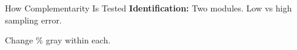 \documentclass[
  ignorenonframetext,
]{beamer}
\begin{document}
\begin{frame}{How Complementarity Is Tested}
\protect\hypertarget{how-complementarity-is-tested}{}
\textbf{Identification:} Two modules. Low vs high sampling error.

\begin{figure}

\begin{minipage}[t]{0.50\linewidth}

{\centering 


}

\end{minipage}%
%
\begin{minipage}[t]{0.50\linewidth}

{\centering 


}

\end{minipage}%

\end{figure}

Change \% gray within each.

\begin{figure}

\begin{minipage}[t]{0.50\linewidth}

{\centering 


}

\end{minipage}%
%
\begin{minipage}[t]{0.50\linewidth}

{\centering 


}

\end{minipage}%

\end{figure}
\end{frame}
\end{document}
